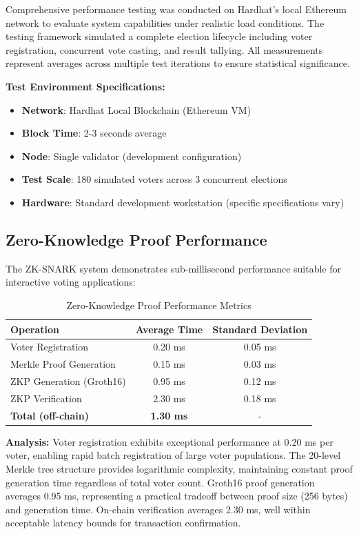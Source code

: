 \documentclass[conference]{IEEEtran}
\begin{document}
Comprehensive performance testing was conducted on Hardhat's local Ethereum network to evaluate system capabilities under realistic load conditions. The testing framework simulated a complete election lifecycle including voter registration, concurrent vote casting, and result tallying. All measurements represent averages across multiple test iterations to ensure statistical significance.

\textbf{Test Environment Specifications:}
\begin{itemize}
    \item \textbf{Network}: Hardhat Local Blockchain (Ethereum VM)
    \item \textbf{Block Time}: 2-3 seconds average
    \item \textbf{Node}: Single validator (development configuration)
    \item \textbf{Test Scale}: 180 simulated voters across 3 concurrent elections
    \item \textbf{Hardware}: Standard development workstation (specific specifications vary)
\end{itemize}

\subsection{Zero-Knowledge Proof Performance}

The ZK-SNARK system demonstrates sub-millisecond performance suitable for interactive voting applications:

\begin{table}[H]
\caption{Zero-Knowledge Proof Performance Metrics}
\centering
\begin{tabular}{|l|c|c|}
\hline
\textbf{Operation} & \textbf{Average Time} & \textbf{Standard Deviation} \\
\hline
Voter Registration & 0.20 ms & 0.05 ms \\
Merkle Proof Generation & 0.15 ms & 0.03 ms \\
ZKP Generation (Groth16) & 0.95 ms & 0.12 ms \\
ZKP Verification & 2.30 ms & 0.18 ms \\
\hline
\textbf{Total (off-chain)} & \textbf{1.30 ms} & - \\
\hline
\end{tabular}
\label{tab:zkp_performance}
\end{table}

\textbf{Analysis:} Voter registration exhibits exceptional performance at 0.20 ms per voter, enabling rapid batch registration of large voter populations. The 20-level Merkle tree structure provides logarithmic complexity, maintaining constant proof generation time regardless of total voter count. Groth16 proof generation averages 0.95 ms, representing a practical tradeoff between proof size (256 bytes) and generation time. On-chain verification averages 2.30 ms, well within acceptable latency bounds for transaction confirmation.
\end{document}
